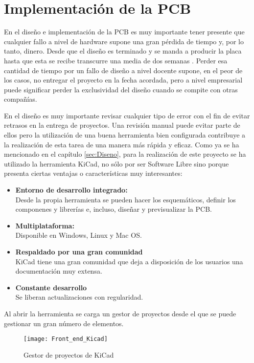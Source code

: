 \chapter{Implementación de la PCB\label{sec:Implementacion_PCB}}

En el diseño e implementación de la \acrshort{PCB} es muy importante tener presente que cualquier fallo a nivel de hardware supone una gran pérdida de tiempo y, por lo tanto, dinero. Desde que el diseño es terminado y se manda a producir la placa hasta que esta se recibe transcurre una media de dos semanas . Perder esa cantidad de tiempo por un fallo de diseño a nivel docente supone, en el peor de los casos, no entregar el proyecto en la fecha acordada, pero a nivel empresarial puede significar perder la exclusividad del diseño cuando se compite con otras compañías. 

En el diseño es muy importante revisar cualquier tipo de error con el fin de evitar retrasos en la entrega de proyectos. Una revisión manual puede evitar parte de ellos pero la utilización de una buena herramienta bien configurada contribuye a la realización de esta tarea de una manera más rápida y eficaz. Como ya se ha mencionado en el capítulo \ref{sec:Diseno}, para la realización de este proyecto se ha utilizado la herramienta KiCad, no sólo por ser Software Libre sino porque presenta ciertas ventajas o características muy interesantes:
\begin{itemize}
\item \textbf{Entorno de desarrollo integrado:}
\\Desde la propia herramienta se pueden hacer los esquemáticos, definir los componenes y librerías e, incluso, diseñar y previsualizar la \acrshort{PCB}.
\item \textbf{Multiplataforma:}
\\Disponible en Windows, Linux y Mac OS.
\item \textbf{Respaldado por una gran comunidad} 
\\KiCad tiene una gran comunidad que deja a disposición de los usuarios una documentación muy extensa.
\item \textbf{Constante desarrollo}
\\Se liberan actualizaciones con regularidad.
\end{itemize}

Al abrir la herramienta se carga un gestor de proyectos desde el que se puede gestionar un gran número de elementos.

\begin{figure} [h]
    \centering
    \texttt{[image: Front\_end\_Kicad]}
    \caption{Gestor de proyectos de KiCad}
    \label{fig:Front_end_Kicad}
\end{figure}


